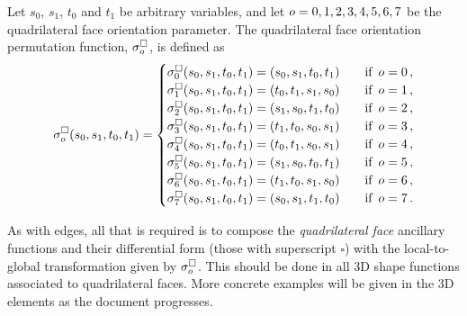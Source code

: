\begin{definition*}
Let $s_0$, $s_1$, $t_0$ and $t_1$ be arbitrary variables, and let $o=0,1,2,3,4,5,6,7$ be the quadrilateral face orientation parameter. 
The quadrilateral face orientation permutation function, $\sigma_o^\square$, is defined as
\begin{equation}
	\sigma_o^\square(s_0,s_1,t_0,t_1)=\begin{cases}
		\sigma_0^\square(s_0,s_1,t_0,t_1)=(s_0,s_1,t_0,t_1)&\quad\text{if  }\,o=0\,,\\
		\sigma_1^\square(s_0,s_1,t_0,t_1)=(t_0,t_1,s_1,s_0)&\quad\text{if  }\,o=1\,,\\
		\sigma_2^\square(s_0,s_1,t_0,t_1)=(s_1,s_0,t_1,t_0)&\quad\text{if  }\,o=2\,,\\
		\sigma_3^\square(s_0,s_1,t_0,t_1)=(t_1,t_0,s_0,s_1)&\quad\text{if  }\,o=3\,,\\
		\sigma_4^\square(s_0,s_1,t_0,t_1)=(t_0,t_1,s_0,s_1)&\quad\text{if  }\,o=4\,,\\
		\sigma_5^\square(s_0,s_1,t_0,t_1)=(s_1,s_0,t_0,t_1)&\quad\text{if  }\,o=5\,,\\
		\sigma_6^\square(s_0,s_1,t_0,t_1)=(t_1,t_0,s_1,s_0)&\quad\text{if  }\,o=6\,,\\
		\sigma_7^\square(s_0,s_1,t_0,t_1)=(s_0,s_1,t_1,t_0)&\quad\text{if  }\,o=7\,.\end{cases}\label{eq:orientQuadFace}
\end{equation}
\end{definition*}


As with edges, all that is required is to compose the \textit{quadrilateral face} ancillary functions and their differential form (those with superscript $\square$) with the local-to-global transformation given by $\sigma_o^\square$.
This should be done in all 3D shape functions associated to quadrilateral faces.
More concrete examples will be given in the 3D elements as the document progresses.

